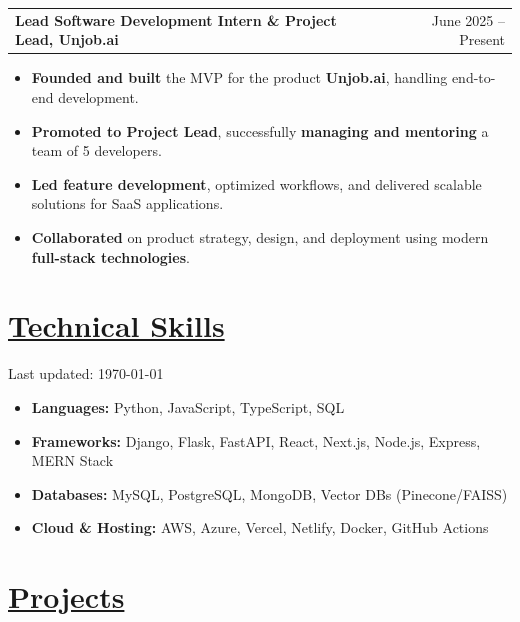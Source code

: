 \documentclass[a4paper,12pt]{article}
\makeatletter
\newenvironment{joblong}[2]
    {
    \begin{tabularx}{\linewidth}{@{}l X r@{}}
    \textbf{#1} & \hfill &  #2 \\[3.75pt]
    \end{tabularx}
    \begin{minipage}[t]{\linewidth}
    \begin{itemize}[nosep,after=\strut, leftmargin=1em, itemsep=3pt,label=--]
    }
    {
    \end{itemize}
    \end{minipage}    
    }
\makeatother
\begin{document}
\begin{joblong}{\textbf{ Lead Software Development Intern \& Project Lead}, Unjob.ai}{June 2025 -- Present}
\item \textbf{Founded and built} the MVP for the product \textbf{Unjob.ai}, handling end-to-end development.  
\item \textbf{Promoted to Project Lead}, successfully \textbf{managing and mentoring} a team of 5 developers.  
\item \textbf{Led feature development}, optimized workflows, and delivered scalable solutions for SaaS applications.  
\item \textbf{Collaborated} on product strategy, design, and deployment using modern \textbf{full-stack technologies}.  
\end{joblong}

\section{\underline{Technical Skills}} {\footnotesize Last updated: \today}

\begin{itemize}
    \item \textbf{Languages:} Python, JavaScript, TypeScript, SQL
    \item \textbf{Frameworks:} Django, Flask, FastAPI, React, Next.js, Node.js, Express, MERN Stack
    \item \textbf{Databases:} MySQL, PostgreSQL, MongoDB, Vector DBs (Pinecone/FAISS)
    \item \textbf{Cloud \& Hosting:} AWS, Azure, Vercel, Netlify, Docker, GitHub Actions
\end{itemize}




\section{\underline{Projects}}
\end{document}

